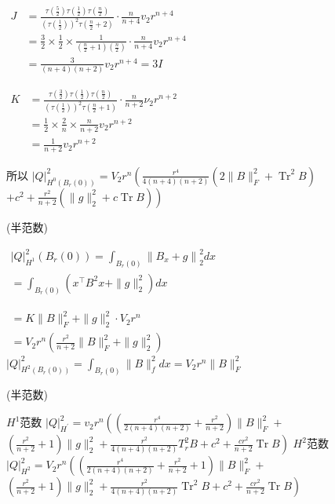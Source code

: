 \documentclass[UTF8]{ctexart}
\begin{document}
\(
\begin{aligned}
J &=\frac{\tau\left(\frac{5}{2}\right) \tau\left(\frac{1}{2}\right) \tau\left(\frac{n}{2}\right)}{\left(\tau\left(\frac{1}{2}\right)\right)^{2} \tau\left(\frac{n}{2}+2\right)} \cdot \frac{n}{n+4} v_{2} r^{n+4} \\
&=\frac{3}{2} \times \frac{1}{2} \times \frac{1}{\left(\frac{n}{2}+1\right)\left(\frac{n}{2}\right)} \cdot \frac{n}{n+4} v_{2} r^{n+4} \\
&=\frac{3}{(n+4)(n+2)} v_{2} r^{n+4}=3 I
\end{aligned}
\)

\(
\begin{aligned}
K &=\frac{\tau\left(\frac{3}{2}\right) \tau\left(\frac{1}{2}\right) \tau\left(\frac{n}{2}\right)}{\left(\tau\left(\frac{1}{2}\right)\right)^{2} \tau\left(\frac{n}{2}+1\right)} \cdot \frac{n}{n+2} \nu_{2} r^{n+2} \\
&=\frac{1}{2} \times \frac{2}{n} \times \frac{n}{n+2} v_{2} r^{n+2} \\
&=\frac{1}{n+2} v_{2} r^{n+2}
\end{aligned}
\)

所以
\(
|Q|_{H^{0}\left(B_{r}(0)\right)}^{2}=V_{2} r^{n}
\left(\frac{r^{4}}{4(n+4)(n+2)}\left(2\|B\|_{F}^{2}+\operatorname{Tr}^{2} B\right)\right.
\)
\(
\left.+c^{2}+\frac{r^{2}}{n+2}\left(\|g\|_{2}^{2}+c \operatorname{Tr} B\right)\right)
\)

(半范数)

\(
\begin{array}{l}
|Q|_{H^{1}}^{2}(B_{r}(0))=\int_{B_{r} (0)}\left\|B_{x}+g\right\|_{2}^{2} d x \\
=\int _{B_{r}(0)}\left(x^{\top} B^{2} x+\|g\|_{2}^{2}\right) d x
\end{array}
\)

\(
\begin{array}{l}
=K\|B\|_{F}^{2}+\|g\|_{2}^{2} \cdot V_{2} r^{n} \\
=V_{2} r^{n}\left(\frac{r^{2}}{n+2}\|B\|_{F}^{2}+\|g\|_{2}^{2}\right)
\end{array}
\)
\(
|Q|_{H^{2}\left(B_{r}(0)\right)}^{2}=\int_{B_{r}(0)}\|B\|_{f}^{2} d x=V_{2} r^{n}\|B\|_{F}^{2}
\)

(半范数)

$H^{1}$范数
\(
|Q|_{H^{\prime}}^{2}=v_{2} r^{n}\left(\left(\frac{r^{4}}{2 (n +4)(n+2)}+\frac{r^{2}}{n+2}\right)\|B\|_{F}^{2}+\right.
\)
\(
\left.\left(\frac{r^{2}}{n+2}+1\right)\|g\|_{2}^{2}+\frac{r^{2}}{4(n+4)(n+2)} T_{r}^{2} B+c^{2}+\frac{c r^{2}}{n+2} \operatorname{Tr} B\right)
\)
$H^{2}$范数
\(
|Q|_{H^{2}}^{2}=V_{2} r^{n}\left(\left(\frac{r^{4}}{2(n+4)(n+2)}+\frac{r^{2}}{n+2}+1\right)\|B\|_{F}^{2}+\right.
\)
\(
\left.\left(\frac{r^{2}}{n+2}+1\right)\|g\|_{2}^{2}+\frac{r^{2}}{4 (n+4)(n+2)} \operatorname{Tr}^{2} B+c^{2}+\frac{c r^{2}}{n+2} \operatorname{Tr} B\right)
\)
\end{document}
